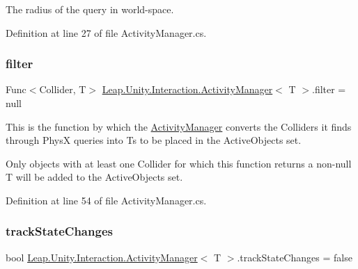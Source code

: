 The radius of the query in world-\/space. 



Definition at line 27 of file Activity\+Manager.\+cs.

\mbox{\label{class_leap_1_1_unity_1_1_interaction_1_1_activity_manager_ac8bb61c2fa074a351cfc4e7a44a0656b}} 
\subsubsection{\texorpdfstring{filter}{filter}}
{\footnotesize\ttfamily Func$<$Collider, T$>$ \mbox{\hyperlink{class_leap_1_1_unity_1_1_interaction_1_1_activity_manager}{Leap.\+Unity.\+Interaction.\+Activity\+Manager}}$<$ T $>$.filter = null}



This is the function by which the \mbox{\hyperlink{class_leap_1_1_unity_1_1_interaction_1_1_activity_manager}{Activity\+Manager}} converts the Colliders it finds through PhysX queries into Ts to be placed in the Active\+Objects set. 

Only objects with at least one Collider for which this function returns a non-\/null T will be added to the Active\+Objects set. 

Definition at line 54 of file Activity\+Manager.\+cs.

\mbox{\label{class_leap_1_1_unity_1_1_interaction_1_1_activity_manager_a0b0c3f27c558d986f943f9f3c1e914d3}} 
\subsubsection{\texorpdfstring{trackStateChanges}{trackStateChanges}}
{\footnotesize\ttfamily bool \mbox{\hyperlink{class_leap_1_1_unity_1_1_interaction_1_1_activity_manager}{Leap.\+Unity.\+Interaction.\+Activity\+Manager}}$<$ T $>$.track\+State\+Changes = false}



